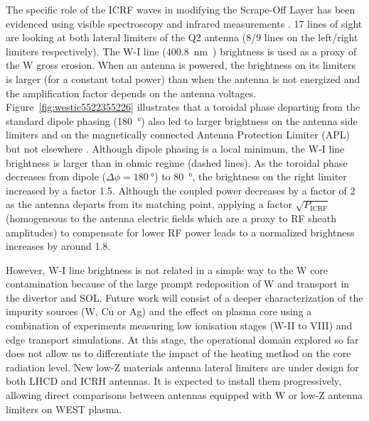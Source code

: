 \documentclass[12p]{iopart}
\begin{document}
The specific role of the ICRF waves in modifying the Scrape-Off Layer has been evidenced using visible spectroscopy and infrared measurements \cite{colas2020, urbanczyk2019, urbanczyk2021}. 17 lines of sight are looking at both lateral limiters of the Q2 antenna (8/9 lines on the left/right limiters respectively). The W-I line (\SI{400.8}{\nano\meter}~) brightness is used as a proxy of the W gross erosion. When an antenna is powered, the brightness on its limiters is larger (for a constant total power) than when the antenna is not energized and the amplification factor depends on the antenna voltages. Figure~\ref{fig:westic5522355226} illustrates that a toroidal phase departing from the standard dipole phasing (\SI{180}{\degree}) also led to larger brightness on the antenna side limiters and on the magnetically connected Antenna Protection Limiter (APL) but not elsewhere \cite{urbanczyk2019}. 
Although dipole phasing is a local minimum, the W-I line brightness is larger than in ohmic regime (dashed lines). As the toroidal phase decreases from dipole ($\Delta\phi=\SI{180}{\degree}$) to \SI{80}{\degree}, the brightness on the right limiter increased by a factor 1.5. Although the coupled power decreases by a factor of 2 as the antenna departs from its matching point, applying a factor $\sqrt{P_{\mathrm{ICRF}}}$ (homogeneous to the antenna electric fields which are a proxy to RF sheath amplitudes\cite{colas2021}) to compensate for lower RF power leads to a normalized brightness increases by around 1.8. 

However, W-I line brightness is not related in a simple way to the W core contamination because of the large prompt redeposition of W and transport in the divertor and SOL. Future work will consist of a deeper characterization of the impurity sources (W, Cu or Ag) and the effect on plasma core using a combination of experiments measuring low ionisation stages (W-II to VIII) and edge transport simulations. At this stage, the operational domain explored so far does not allow us to differentiate the impact of the heating method on the core radiation level. New low-Z materials antenna lateral limiters are under design for both LHCD and ICRH antennas. It is expected to install them progressively, allowing direct comparisons between antennas equipped with W or low-Z antenna limiters on WEST plasma.
\end{document}
